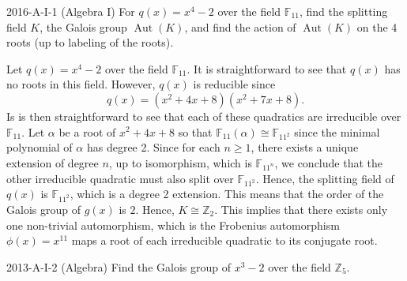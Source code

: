 \documentclass{article}
\begin{document}
\begin{prb}{2016-A-I-1 (Algebra I)}	For $q(x) = x^{4} - 2$ over the field $\mathbb{F}_{11}$, find the splitting field $K$, the Galois group $\operatorname{Aut}(K)$, and find the action of $\operatorname{Aut}(K)$ on the 4 roots (up to labeling of the roots). 
\end{prb}
\begin{solutions}
	Let $q(x) = x^{4} - 2$ over the field $\mathbb{F}_{11}$. It is straightforward to see that $q(x)$ has no roots in this field. However, $q(x)$ is reducible since 
		\begin{equation}
			q(x) = (x^{2} + 4x + 8)(x^{2} + 7x +  8). 
		\end{equation}
	Is is then straightforward to see that each of these quadratics are irreducible over $\mathbb{F}_{11}$. Let $\alpha$ be a root of $x^{2} + 4x + 8$ so that $\mathbb{F}_{11}(\alpha) \cong \mathbb{F}_{11^{2}}$ since the minimal polynomial of $\alpha$ has degree 2. Since for each $n \geq 1$, there exists a unique extension of degree $n$, up to isomorphism, which is $\mathbb{F}_{11^{n}}$, we conclude that the other irreducible quadratic must also split over $\mathbb{F}_{11^{2}}$. Hence, the splitting field of $q(x)$ is $\mathbb{F}_{11^{2}}$, which is a degree 2 extension. This means that the order of the Galois group of $g(x)$ is $2$. Hence, $K \cong \mathbb{Z}_{2}$. This implies that there exists only one non-trivial automorphism, which is the Frobenius automorphism $\phi(x) = x^{11}$ maps a root of each irreducible quadratic to its conjugate root. 
\end{solutions} 
\begin{prb}{2013-A-I-2 (Algebra)}
	Find the Galois group of $x^{3} - 2$ over the field $\mathbb{Z}_{5}$. 
\end{prb}
\end{document}
